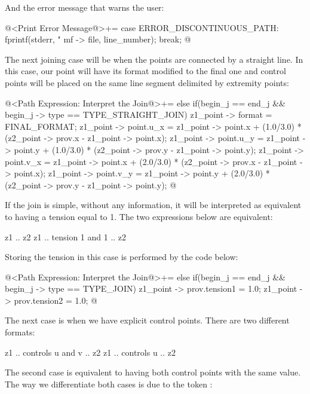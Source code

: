 {{{{{And the error message that warns the user:

\iniciocodigo
@<Print Error Message@>+=
case ERROR_DISCONTINUOUS_PATH:
  fprintf(stderr,
          "%
          mf -> file, line_number);
  break;
@
\fimcodigo

The next joining case will be when the points are connected by a
straight line. In this case, our point will have its format modified
to the final one and control points will be placed on the same line
segment delimited by extremity points:

\iniciocodigo
@<Path Expression: Interpret the Join@>+=
else if(begin_j == end_j && begin_j -> type == TYPE_STRAIGHT_JOIN){
  z1_point -> format = FINAL_FORMAT;
  z1_point -> point.u_x = z1_point -> point.x + (1.0/3.0) *
                         (z2_point -> prov.x - z1_point -> point.x);
  z1_point -> point.u_y = z1_point -> point.y + (1.0/3.0) *
                         (z2_point -> prov.y - z1_point -> point.y);
  z1_point -> point.v_x = z1_point -> point.x + (2.0/3.0) *
                         (z2_point -> prov.x - z1_point -> point.x);
  z1_point -> point.v_y = z1_point -> point.y + (2.0/3.0) *
                         (z2_point -> prov.y - z1_point -> point.y);
}
@
\fimcodigo

If the join is simple, without any information, it will be interpreted
as equivalent to having a tension equal to 1. The two expressions
below are equivalent:

\alinhaverbatim
z1 .. z2
z1 .. tension 1 and 1 .. z2
\alinhanormal

Storing the tension in this case is performed by the code below:

\iniciocodigo
@<Path Expression: Interpret the Join@>+=
else if(begin_j == end_j && begin_j -> type == TYPE_JOIN){
  z1_point -> prov.tension1 = 1.0;
  z1_point -> prov.tension2 = 1.0;
}
@
\fimcodigo

The next case is when we have explicit control points. There are two
different formats:

\alinhaverbatim
z1 .. controls u and v .. z2
z1 .. controls u .. z2
\alinhanormal

The second case is equivalent to having both control points with the
same value. The way we differentiate both cases is due to the
token :

}}}}}

